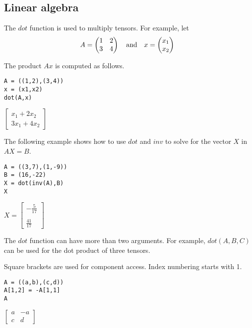 \subsection{Linear algebra}

The $dot$ function is used to multiply tensors.
For example, let
\begin{equation*}
A=\begin{pmatrix}1&2\\3&4\end{pmatrix}
\quad{\rm and}\quad x=\begin{pmatrix}x_1\\x_2\end{pmatrix}
\end{equation*}

\noindent
The product $Ax$ is computed as follows.

{\color{blue}
\begin{verbatim}
A = ((1,2),(3,4))
x = (x1,x2)
dot(A,x)
\end{verbatim}
}

\noindent
$\begin{bmatrix}
x_1+2x_2\\
3x_1+4x_2
\end{bmatrix}$

\bigskip
\noindent
The following example shows how to use $dot$ and $inv$ to solve for
the vector $X$ in $AX=B$.

{\color{blue}
\begin{verbatim}
A = ((3,7),(1,-9))
B = (16,-22)
X = dot(inv(A),B)
X
\end{verbatim}
}

\noindent
$X=\begin{bmatrix}-\tfrac{5}{17}\\ \\ \tfrac{41}{17}\end{bmatrix}$

\bigskip
\noindent
The $dot$ function can have more than two arguments.
For example, $dot(A,B,C)$ can be used for the dot product of three tensors.

\bigskip
\noindent
Square brackets are used for component access.
Index numbering starts with 1.

{\color{blue}
\begin{verbatim}
A = ((a,b),(c,d))
A[1,2] = -A[1,1]
A
\end{verbatim}
}

\noindent
$\begin{bmatrix}a&-a\\c&d\end{bmatrix}$


